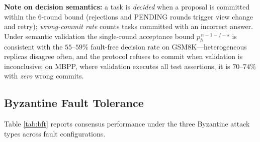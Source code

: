 \documentclass{article}
\begin{document}
\textbf{Note on decision semantics:} a task is \emph{decided} when a proposal is committed within the 6-round bound (rejections and PENDING rounds trigger view change and retry); \emph{wrong-commit rate} counts tasks committed with an incorrect answer. Under semantic validation the single-round acceptance bound $p_h^{\,n-1-f-s}$ is consistent with the $55$--$59\%$ fault-free decision rate on GSM8K---heterogeneous replicas disagree often, and the protocol refuses to commit when validation is inconclusive; on MBPP, where validation executes all test assertions, it is $70$--$74\%$ with \emph{zero} wrong commits.

\subsection{Byzantine Fault Tolerance}
Table \ref{tab:bft} reports consensus performance under the three Byzantine attack types across fault configurations.
\end{document}

